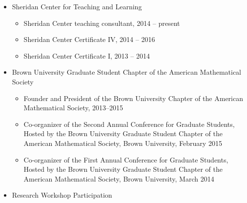 \begin{itemize}
  \item Sheridan Center for Teaching and Learning

    \begin{itemize}
      \item  Sheridan Center teaching consultant,  2014 -- present %
      \item  Sheridan Center Certificate IV, 2014 -- 2016 %
      \item  Sheridan Center Certificate I, 2013 -- 2014 %
    \end{itemize}

  \item Brown University Graduate Student Chapter of the American Mathematical Society

    \begin{itemize}
      \item Founder and President of the Brown University Chapter of the American
        Mathematical Society, 2013--2015
      \item	Co-organizer of the Second Annual Conference for Graduate Students, Hosted by
        the Brown University Graduate Student Chapter of the American Mathematical
        Society, Brown University, February 2015
      \item	Co-organizer of the First Annual Conference for Graduate Students, Hosted by
        the Brown University Graduate Student Chapter of the American Mathematical
        Society, Brown University, March 2014
    \end{itemize}

  \item Research Workshop Participation


\end{itemize}
